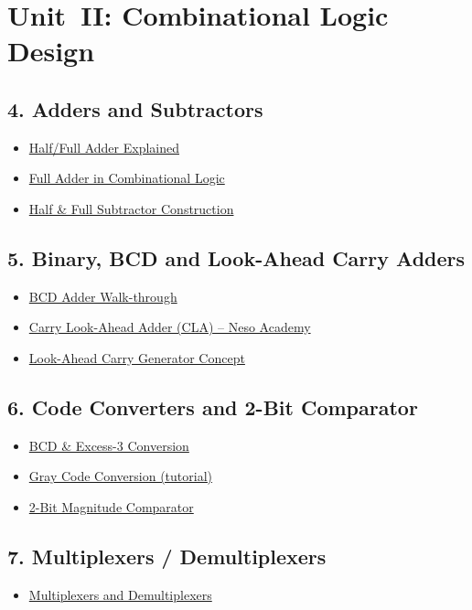 \documentclass{article}
\begin{document}
\section*{Unit~II: Combinational Logic Design}
\subsection*{4. Adders and Subtractors}
\begin{itemize}
  \item \href{https://www.youtube.com/watch?v=16KEelHu-T4}{Half/Full Adder Explained}
  \item \href{https://www.youtube.com/watch?v=HAZZ32E4dKs}{Full Adder in Combinational Logic}
  \item \href{https://www.youtube.com/watch?v=IVnfS3yZTMk}{Half \& Full Subtractor Construction}
\end{itemize}
\subsection*{5. Binary, BCD and Look-Ahead Carry Adders}
\begin{itemize}
  \item \href{https://www.youtube.com/watch?v=M5WvsyZinb4}{BCD Adder Walk-through}
  \item \href{https://www.youtube.com/watch?v=6Z1WikEWxH0}{Carry Look-Ahead Adder (CLA) -- Neso Academy}
  \item \href{https://www.youtube.com/watch?v=xiv6uEngtao}{Look-Ahead Carry Generator Concept}
\end{itemize}
\subsection*{6. Code Converters and 2-Bit Comparator}
\begin{itemize}
  \item \href{https://www.youtube.com/watch?v=LH2MsykHBUU}{BCD \& Excess-3 Conversion}
  \item \href{https://www.youtube.com/watch?v=110}{Gray Code Conversion (tutorial)}
  \item \href{https://www.youtube.com/watch?v=gpNbMnswngU}{2-Bit Magnitude Comparator}
\end{itemize}
\subsection*{7. Multiplexers / Demultiplexers}
\begin{itemize}
  \item \href{https://www.youtube.com/watch?v=HIeQhZ9Gq5s}{Multiplexers and Demultiplexers}
\end{itemize}
\end{document}
